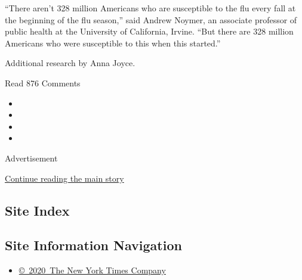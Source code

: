 ``There aren't 328 million Americans who are susceptible to the flu
every fall at the beginning of the flu season,'' said Andrew Noymer, an
associate professor of public health at the University of California,
Irvine. ``But there are 328 million Americans who were susceptible to
this when this started.''

Additional research by Anna Joyce.

Read 876 Comments

\begin{itemize}
\item
\item
\item
\item
\end{itemize}

Advertisement

\protect\hyperlink{after-bottom}{Continue reading the main story}

\hypertarget{site-index}{%
\subsection{Site Index}\label{site-index}}

\hypertarget{site-information-navigation}{%
\subsection{Site Information
Navigation}\label{site-information-navigation}}

\begin{itemize}
\tightlist
\item
  \href{https://help.nytimes3xbfgragh.onion/hc/en-us/articles/115014792127-Copyright-notice}{©~2020~The
  New York Times Company}
\end{itemize}


